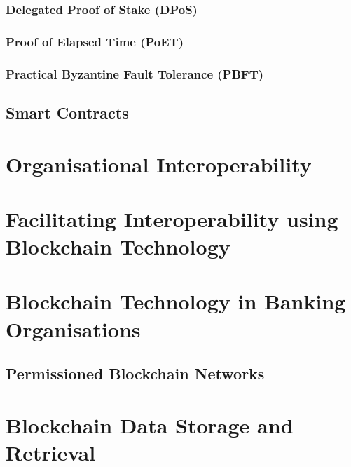 \subsubsection{Delegated Proof of Stake (DPoS)}

\subsubsection{Proof of Elapsed Time (PoET)}

\subsubsection{Practical Byzantine Fault Tolerance (PBFT)}

\subsection{Smart Contracts}

\section{Organisational Interoperability}

\section{Facilitating Interoperability using Blockchain Technology}

\section{Blockchain Technology in Banking Organisations}

\subsection{Permissioned Blockchain Networks}

\section{Blockchain Data Storage and Retrieval}